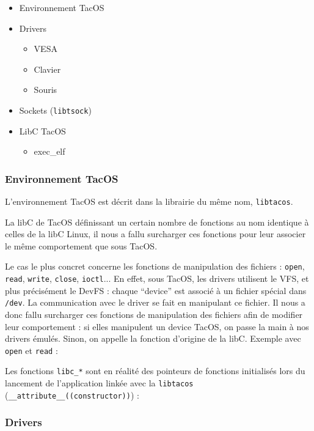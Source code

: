 \begin{itemize}
  \item Environnement TacOS
  \item Drivers
  \begin{itemize}
    \item VESA
    \item Clavier
    \item Souris 
  \end{itemize}
  \item Sockets (\verb|libtsock|)
  \item LibC TacOS
  \begin{itemize}
    \item exec\_elf
  \end{itemize}
\end{itemize}

\subsubsection{Environnement TacOS}

L'environnement TacOS est décrit dans la librairie du même nom, \verb|libtacos|.

La libC de TacOS définissant un certain nombre de fonctions au nom identique à celles de la libC Linux, il nous a fallu surcharger ces fonctions pour leur associer le même comportement que sous TacOS.

Le cas le plus concret concerne les fonctions de manipulation des fichiers : \verb|open|, \verb|read|, \verb|write|, \verb|close|, \verb|ioctl|...
En effet, sous TacOS, les drivers utilisent le VFS, et plus précisément le DevFS : chaque ``device'' est associé à un fichier spécial dans \verb|/dev|. La communication avec le driver se fait en manipulant ce fichier. Il nous a donc fallu surcharger ces fonctions de manipulation des fichiers afin de modifier leur comportement : si elles manipulent un device TacOS, on passe la main à nos drivers émulés. Sinon, on appelle la fonction d'origine de la libC. Exemple avec \verb|open| et \verb|read| :




Les fonctions \verb|libc_*| sont en réalité des pointeurs de fonctions initialisés lors du lancement de l'application linkée avec la \verb|libtacos| (\verb|__attribute__((constructor))|) :



\subsubsection{Drivers}

